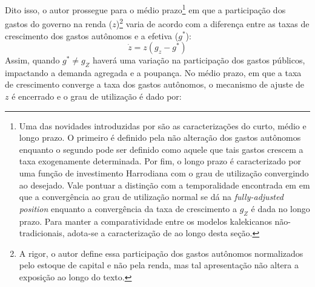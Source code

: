 Dito isso, o autor prossegue para o médio prazo\footnote{Uma das novidades introduzidas por \textcite{allain_macroeconomic_2014} são as caracterizações do curto, médio e longo prazo. O primeiro é definido pela não alteração dos gastos autônomos enquanto o segundo pode ser definido como aquele que tais gastos crescem a taxa exogenamente determinada. Por fim, o longo prazo é caracterizado por uma função de investimento Harrodiana com o grau de utilização convergindo ao desejado. Vale pontuar a distinção com a temporalidade encontrada em \textcite{freitas_growth_2015} em que a convergência ao grau de utilização normal se dá na \textit{fully-adjusted position} enquanto a convergência da taxa de crescimento a $g_Z$ é dada no longo prazo. Para manter a comparatividade entre os modelos kalekicanos não-tradicionais, adota-se a caracterização de \textcite{allain_macroeconomic_2014} ao longo desta seção.} em que a participação dos gastos do governo na renda ($z$)\footnote{A rigor, o autor define essa participação dos gastos autônomos normalizados pelo estoque de capital e não pela renda, mas tal apresentação não altera a exposição ao longo do texto.} varia de acordo com a diferença entre as taxas de crescimento dos gastos autônomos e a efetiva ($g^*$):
\begin{equation}
    \dot z = z (g_z - g^*)
\end{equation}
Assim, quando $g^*\neq g_Z$  haverá uma variação na participação dos gastos públicos, impactando a demanda agregada e a poupança. No médio prazo, em que a taxa de crescimento converge a taxa dos gastos autônomos, o mecanismo de ajuste de $z$ é encerrado e o grau de utilização é dado por:

